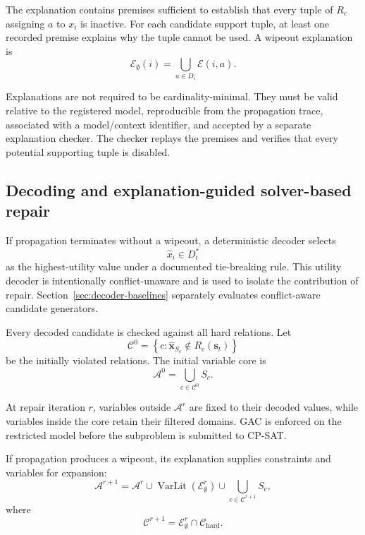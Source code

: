 \documentclass[pdflatex,sn-mathphys-num,iicol,oneside]{sn-jnl}
\newcommand{\gac}{\textsc{GAC}\xspace}
\newcommand{\cpsat}{\textsc{CP-SAT}\xspace}
\begin{document}
The explanation contains premises sufficient to establish that every
tuple of $R_c$ assigning $a$ to $x_i$ is inactive. For each candidate
support tuple, at least one recorded premise explains why the tuple
cannot be used. A wipeout explanation is
\begin{equation}
\mathcal{E}_{\emptyset}(i)
=
\bigcup_{a\in D_i}
\mathcal{E}(i,a).
\end{equation}

Explanations are not required to be cardinality-minimal. They must be
valid relative to the registered model, reproducible from the
propagation trace, associated with a model/context identifier, and
accepted by a separate explanation checker. The checker replays the
premises and verifies that every potential supporting tuple is
disabled.

\subsection{Decoding and explanation-guided solver-based repair}
\label{sec:repair}

If propagation terminates without a wipeout, a deterministic decoder
selects
\begin{equation}
\widehat{x}_i\in D_i^{*}
\end{equation}
as the highest-utility value under a documented tie-breaking rule.
This utility decoder is intentionally conflict-unaware and is used to
isolate the contribution of repair. Section~\ref{sec:decoder-baselines}
separately evaluates conflict-aware candidate generators.

Every decoded candidate is checked against all hard relations. Let
\begin{equation}
\mathcal{C}^{0}
=
\left\{
c:
\widehat{\bm{x}}_{S_c}
\notin
R_c(\bm{s}_t)
\right\}
\end{equation}
be the initially violated relations. The initial variable core is
\begin{equation}
\mathcal{A}^{0}
=
\bigcup_{c\in\mathcal{C}^{0}}S_c.
\end{equation}

At repair iteration $r$, variables outside
$\mathcal{A}^{r}$ are fixed to their decoded values, while variables
inside the core retain their filtered domains. \gac is enforced on
the restricted model before the subproblem is submitted to \cpsat.

If propagation produces a wipeout, its explanation supplies
constraints and variables for expansion:
\begin{equation}
\mathcal{A}^{r+1}
=
\mathcal{A}^{r}
\cup
\operatorname{VarLit}
\left(
\mathcal{E}_{\emptyset}^{r}
\right)
\cup
\bigcup_{c\in\mathcal{C}^{r+1}}S_c,
\label{eq:variable-expansion}
\end{equation}
where
\begin{equation}
\mathcal{C}^{r+1}
=
\mathcal{E}_{\emptyset}^{r}
\cap
\mathcal{C}_{\mathrm{hard}}.
\end{equation}
\end{document}
